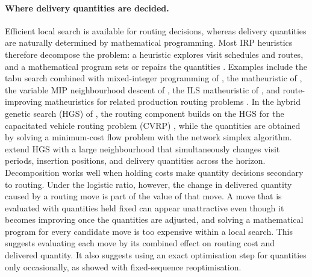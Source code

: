 \paragraph{Where delivery quantities are decided.}
Efficient local search is available for routing decisions, whereas delivery
quantities are naturally determined by mathematical programming. Most IRP
heuristics therefore decompose the problem: a heuristic explores visit
schedules and routes, and a mathematical program sets or repairs the
quantities \citep{iswari2026extending}. Examples include the tabu search
combined with mixed-integer programming of \citet{archetti2012hybrid}, the
matheuristic of \citet{archetti2017matheuristic}, the variable MIP
neighbourhood descent of \citet{coelho2020variable}, the ILS matheuristic of
\citet{lagana2024iterated}, and route-improving matheuristics for related
production routing problems \citep{vadseth2023multi}. In the hybrid genetic
search (HGS) of \citet{castro2026hybrid}, the routing component builds on the
HGS for the capacitated vehicle routing problem (CVRP)
\citep{vidal2022hybrid}, while the quantities are obtained by solving a
minimum-cost flow problem with the network simplex algorithm.
\citet{zhao2025large} extend HGS with a large neighbourhood that
simultaneously changes visit periods, insertion positions, and delivery
quantities across the horizon. Decomposition works well when holding costs
make quantity decisions secondary to routing. Under the logistic ratio,
however, the change in delivered quantity caused by a routing move is part
of the value of that move. A move that is evaluated with quantities held
fixed can appear unattractive even though it becomes improving once the
quantities are adjusted, and solving a mathematical program for every
candidate move is too expensive within a local search. This suggests
evaluating each move by its combined effect on routing cost and delivered
quantity. It also suggests using an exact optimisation step for quantities
only occasionally, as \citet{he2020fixedsequence} showed with fixed-sequence
reoptimisation.


